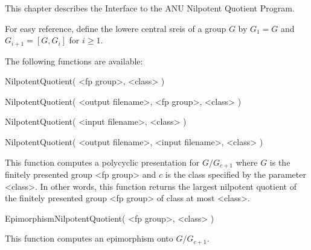

This chapter describes the Interface to the ANU Nilpotent Quotient
Program.

For easy reference, define the lowere central sreis of a group $G$ by
$G_1 = G$ and $G_{i+1} = [G,G_i]$ for $i \geq 1.$


The following functions are available:

\>NilpotentQuotient( <fp group>, <class> )

\>NilpotentQuotient( <output filename>, <fp group>, <class> )

\>NilpotentQuotient( <input filename>, <class> )

\>NilpotentQuotient( <output filename>, <input filename>, <class> )

This function computes a polycyclic presentation for $G/G_{c+1}$ where
$G$ is  the finitely presented group  <fp group> and $c$  is the class
specified  by the parameter  <class>.  In  other words,  this function
returns the largest nilpotent quotient of the finitely presented group
<fp group> of class at most <class>.

\>EpimorphismNilpotentQuotient( <fp group>, <class> )

This function computes an epimorphism onto $G/G_{c+1}.$



